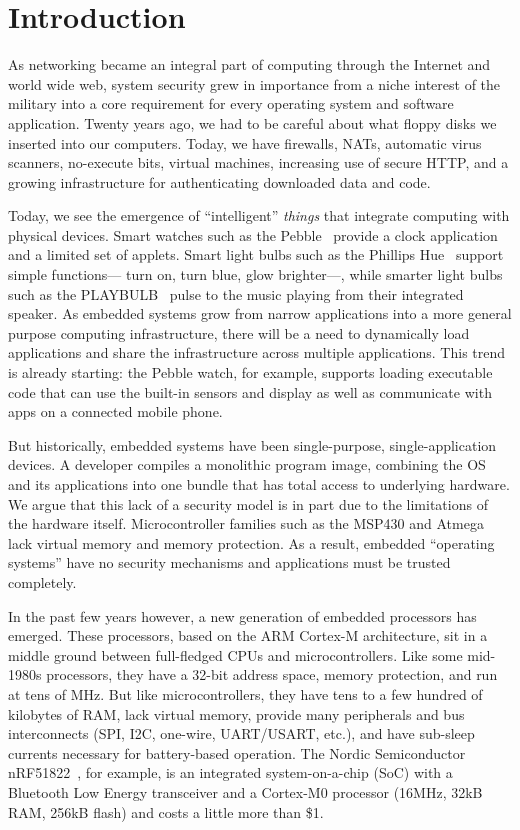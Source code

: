 \section{Introduction}

As networking became an integral part of computing through the Internet and
world wide web, system security grew in importance from a niche interest of the
military into a core requirement for every operating system and software
application. Twenty years ago, we had to be careful about what floppy disks we
inserted into our computers. Today, we have firewalls, NATs, automatic virus
scanners, no-execute bits, virtual machines, increasing use of secure HTTP, and
a growing infrastructure for authenticating downloaded data and code.

Today, we see the emergence of ``intelligent'' \textit{things} that integrate
computing with physical devices. Smart watches such as the Pebble~\cite{pebble}
provide a clock application and a limited set of applets. Smart light bulbs such
as the Phillips Hue~\cite{hue} support simple functions--- turn on, turn blue,
glow brighter---, while smarter light bulbs such as the PLAYBULB~\cite{playbulb}
pulse to the music playing from their integrated speaker.  As embedded systems
grow from narrow applications into a more general purpose computing
infrastructure, there will be a need to dynamically load applications and share
the infrastructure across multiple applications.  This trend is already
starting: the Pebble watch, for example, supports loading executable code that
can use the built-in sensors and display as well as communicate with apps on a
connected mobile phone.


But historically, embedded systems have been single-purpose, single-application
devices.  A developer compiles a monolithic program image, combining the OS and
its applications into one bundle that has total access to underlying hardware.
We argue that this lack of a security model is in part due to the limitations of
the hardware itself. Microcontroller families such as the MSP430 and Atmega lack
virtual memory and memory protection.  As a result, embedded ``operating
systems'' have no security mechanisms and applications must be trusted
completely.

In the past few years however, a new generation of embedded processors has
emerged. These processors, based on the ARM Cortex-M architecture, sit in a
middle ground between full-fledged CPUs and microcontrollers. Like some
mid-1980s processors, they have a 32-bit address space, memory protection, and
run at tens of MHz. But like microcontrollers, they have tens to a few hundred
of kilobytes of RAM, lack virtual memory, provide many peripherals and bus
interconnects (SPI, I2C, one-wire, UART/USART, etc.), and have sub-\uA sleep
currents necessary for battery-based operation. The Nordic Semiconductor
nRF51822~\cite{nrf51822}, for example, is an integrated system-on-a-chip (SoC)
with a Bluetooth Low Energy transceiver and a Cortex-M0 processor (16MHz, 32kB
RAM, 256kB flash) and costs a little more than \$1.

